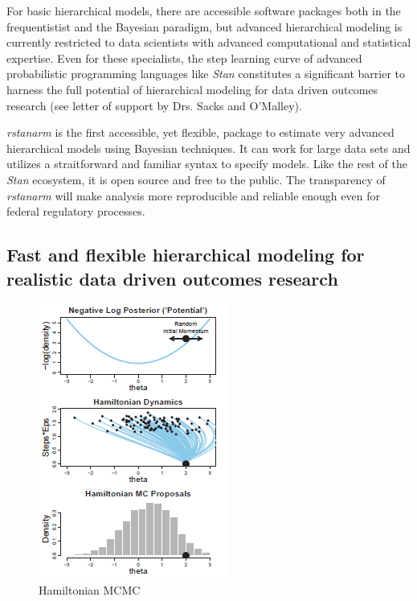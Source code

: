 \documentclass[11pt,notitlepage]{article}
\begin{document}
For basic hierarchical models, there are accessible software 
packages both in the frequentistist and the Bayesian paradigm, but advanced 
hierarchical modeling is currently restricted to data scientists 
with advanced computational and statistical expertise. Even for these specialists, 
the step learning curve of advanced probabilistic programming languages like 
\textit{Stan} constitutes a significant barrier to harness the full potential 
of hierarchical modeling for data driven outcomes research (see letter of support 
by Drs. Sacks and O'Malley).

\textit{rstanarm} is the first accessible, yet flexible, package to estimate
very advanced hierarchical models using Bayesian techniques. It can work for large data 
sets and utilizes a straitforward and familiar syntax to specify models. Like the 
rest of the \textit{Stan} ecosystem, it is open source and free to the public. 
The transparency of \textit{rstanarm} will make analysis more 
reproducible and reliable enough even for federal regulatory processes. 

\subsection*{Fast and flexible hierarchical modeling for realistic data driven outcomes research }

\begin{figure}
  \vspace{-15pt}
 \includegraphics[scale=0.85]{Figures/Hamiltonian.png}
  \vspace{-14pt}
  \caption{Hamiltonian MCMC}
    \label{fig:Hamiltonian}
 \vspace{-16 pt}
\end{figure}
\end{document}
